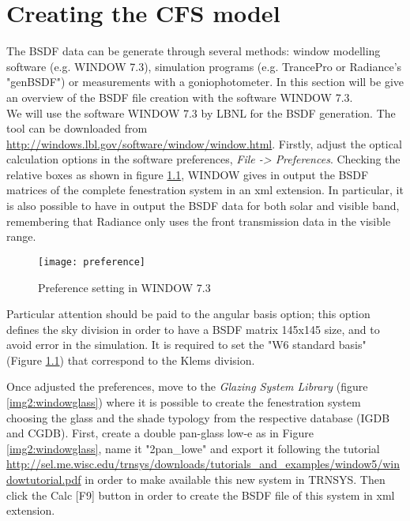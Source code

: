 \chapter{Creating the CFS model}\label{sec:cfs}
The BSDF data can be generate through several methods: window modelling software (e.g. WINDOW 7.3), simulation programs (e.g. TrancePro or Radiance's "genBSDF") or measurements with a goniophotometer. In this section will be give an overview of the BSDF file creation with the software WINDOW 7.3.\\

We will use the software WINDOW 7.3 by LBNL for the BSDF generation. The tool can be downloaded from \url{http://windows.lbl.gov/software/window/window.html}.
Firstly, adjust the optical calculation options in the software preferences, \textit{File -> Preferences}. Checking the relative boxes as shown in figure \ref{img2:preference}, WINDOW gives in output the BSDF matrices of the complete fenestration system in an xml extension. In particular, it is also possible to have in output the BSDF data for both solar and visible band, remembering that Radiance only uses the front transmission data in the visible range. 

\begin{figure}[h]
\centering
\texttt{[image: preference]}
\caption{\label{img2:preference} Preference setting in WINDOW 7.3}
\end{figure}

Particular attention should be paid to the angular basis option; this option defines the sky division in order to have a BSDF matrix 145x145 size, and to avoid error in the simulation. It is required to set the "W6 standard basis" (Figure \ref{img2:preference}) that correspond to the Klems division.

Once adjusted the preferences, move to the \textit{Glazing System Library} (figure \ref{img2:windowglass}) where it is possible to create the fenestration system choosing the glass and the shade typology from the respective database (IGDB and CGDB). First, create a double pan-glass low-e as in Figure \ref{img2:windowglass}, name it "2pan\_lowe" and export it following the tutorial \url{http://sel.me.wisc.edu/trnsys/downloads/tutorials_and_examples/window5/windowtutorial.pdf} in order to make available this new system in TRNSYS. Then click the Calc [F9] button in order to create the BSDF file of this system in xml extension.\\


